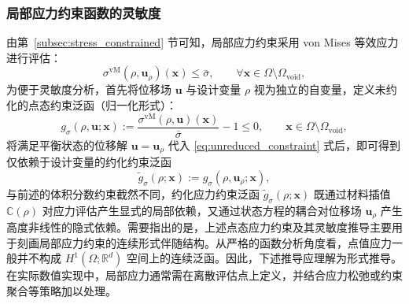 \subsubsection*{局部应力约束函数的灵敏度}

由第~\ref{subsec:stress_constrained} 节可知，局部应力约束采用 von Mises 等效应力进行评估：
\[
\sigma^{\mathrm{vM}}(\rho, \boldsymbol{u}_\rho)(\boldsymbol{x}) \le \bar{\sigma}, \qquad  \forall \boldsymbol{x}\in \Omega\setminus\Omega_{\mathrm{void}},
\]
为便于灵敏度分析，首先将位移场 $\boldsymbol{u}$ 与设计变量 $\rho$ 视为独立的自变量，定义未约化的点态约束泛函（归一化形式）：
\begin{equation}
	g_\sigma(\rho, \boldsymbol{u}; \boldsymbol{x}) := \frac{\sigma^{\mathrm{vM}}(\rho, \boldsymbol{u})(\boldsymbol{x})}{\bar{\sigma}} - 1 \le 0, \qquad \boldsymbol{x}\in \Omega\setminus\Omega_{\mathrm{void}},
	\label{eq:unreduced_constraint}
\end{equation}
将满足平衡状态的位移解 $\boldsymbol{u} = \boldsymbol{u}_\rho$ 代入 \eqref{eq:unreduced_constraint} 式后，即可得到仅依赖于设计变量的约化约束泛函
\[
\tilde g_\sigma(\rho;\boldsymbol{x}) := g_\sigma(\rho,\boldsymbol{u}_\rho;\boldsymbol{x}),
\]
与前述的体积分数约束截然不同，约化应力约束泛函 $\tilde{g}_\sigma(\rho; \boldsymbol{x})$ 既通过材料插值 $\mathbb{C}(\rho)$ 对应力评估产生显式的局部依赖，又通过状态方程的耦合对位移场 $\boldsymbol{u}_\rho$ 产生高度非线性的隐式依赖。需要指出的是，上述点态应力约束及其灵敏度推导主要用于刻画局部应力约束的连续形式伴随结构。从严格的函数分析角度看，点值应力一般并不构成 $H^1(\Omega;\mathbb{R}^d)$ 空间上的连续泛函。因此，下述推导应理解为形式推导。在实际数值实现中，局部应力通常需在离散评估点上定义，并结合应力松弛或约束聚合等策略加以处理。

